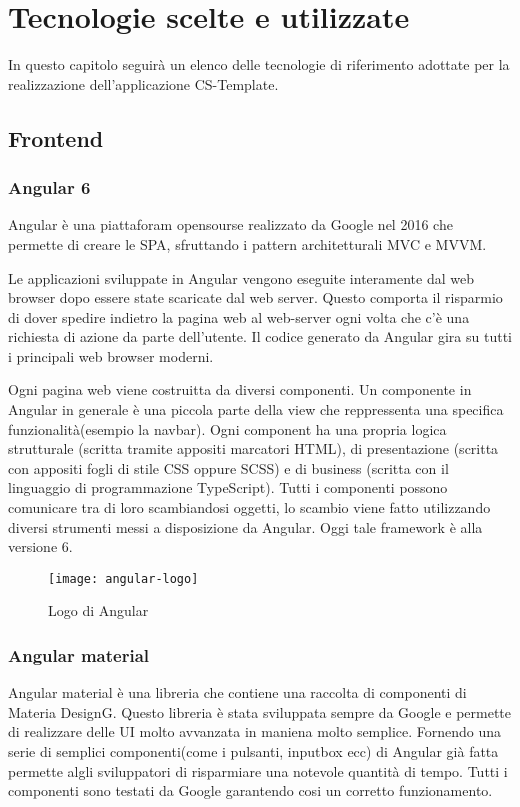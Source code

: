 
\chapter{Tecnologie scelte e utilizzate}
\label{cap:Tecnologie scelte e utilizzate}
In questo capitolo seguirà un elenco delle tecnologie di riferimento adottate per la realizzazione dell'applicazione CS-Template.
\section{Frontend}
\subsection{Angular 6}
Angular è una piattaforam opensourse realizzato da Google nel 2016 che permette di creare le SPA, sfruttando i
pattern architetturali MVC e MVVM.

Le applicazioni sviluppate in Angular vengono eseguite interamente dal web browser dopo essere state scaricate dal web server. Questo comporta il risparmio di dover spedire indietro la pagina web al web-server ogni volta che c'è una richiesta di azione da parte dell'utente. Il codice generato da Angular gira su tutti i principali web browser moderni.

Ogni pagina web viene costruitta da diversi componenti. Un componente in Angular in generale è una piccola parte della view che reppressenta una specifica funzionalità(esempio la navbar).   Ogni component ha una propria logica
strutturale (scritta tramite appositi marcatori HTML), di presentazione (scritta con
appositi fogli di stile CSS oppure SCSS) e di business (scritta con il linguaggio di programmazione
TypeScript). Tutti i componenti possono comunicare tra di loro scambiandosi
oggetti, lo scambio viene fatto utilizzando diversi strumenti messi a disposizione da Angular. Oggi tale framework è alla versione 6.
\begin{figure}[!h] 
	\centering 
	\texttt{[image: angular-logo]} 
	\caption{Logo di Angular}
\end{figure}

\subsection{Angular material}
Angular material è una libreria che contiene una raccolta di componenti di Materia DesignG. Questo libreria è stata sviluppata sempre da Google e permette di realizzare delle UI molto avvanzata in maniena molto semplice. Fornendo una serie di semplici componenti(come i pulsanti, inputbox ecc) di Angular già fatta permette algli sviluppatori di risparmiare una notevole quantità di tempo. Tutti i componenti sono testati da Google garantendo cosi un corretto funzionamento.

